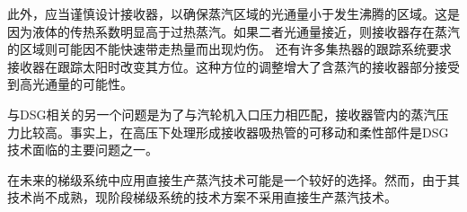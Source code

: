 此外，应当谨慎设计接收器，以确保蒸汽区域的光通量小于发生沸腾的区域。这是因为液体的传热系数明显高于过热蒸汽。如果二者光通量接近，则接收器存在蒸汽的区域则可能因不能快速带走热量而出现灼伤。
还有许多集热器的跟踪系统要求接收器在跟踪太阳时改变其方位。这种方位的调整增大了含蒸汽的接收器部分接受到高光通量的可能性。
			
与DSG相关的另一个问题是为了与汽轮机入口压力相匹配，接收器管内的蒸汽压力比较高。事实上，在高压下处理形成接收器吸热管的可移动和柔性部件是DSG技术面临的主要问题之一。

在未来的梯级系统中应用直接生产蒸汽技术可能是一个较好的选择。然而，由于其技术尚不成熟，现阶段梯级系统的技术方案不采用直接生产蒸汽技术。

